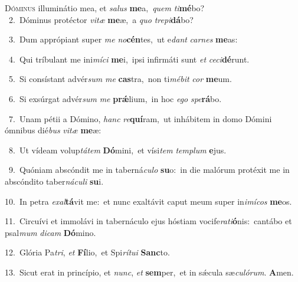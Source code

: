 \lettrine{\initial\textcolor{\initialcolor}{D}}{óminus} illuminátio mea, et \textit{sa}\-\textit{lus} \textbf{me}\-a,~\star \textit{quem} \textit{ti}\-\textbf{mé}bo?\\
{\numbfont\textcolor{\numbcolor}{~2.}}~Dóminus protéctor \textit{vi}\-\textit{tæ} \textbf{me}\-æ,~\star a \textit{quo} \textit{tre}\-\textit{pi}\textbf{dá}bo?\par
{\numbfont\textcolor{\numbcolor}{~3.}}~Dum apprópiant super \textit{me} \textit{no}\-\textbf{cén}tes,~\star ut e\textit{dant} \textit{car}\-\textit{nes} \textbf{me}\-as:\par
{\numbfont\textcolor{\numbcolor}{~4.}}~Qui tríbulant me ini\-\textit{mí}\-\textit{ci} \textbf{me}\-i,~\star ipsi infirmáti sunt \textit{et} \textit{ce}\-\textit{ci}\textbf{dé}runt.\par
{\numbfont\textcolor{\numbcolor}{~5.}}~Si consístant advér\textit{sum} \textit{me} \textbf{cas}\-tra,~\star non ti\-\textit{mé}\-\textit{bit} \textit{cor} \textbf{me}\-um.\par
{\numbfont\textcolor{\numbcolor}{~6.}}~Si exsúrgat advér\textit{sum} \textit{me} \textbf{prǽ}\-lium,~\star in hoc \textit{e}\-\textit{go} \textit{spe}\-\textbf{rá}bo.\par
{\numbfont\textcolor{\numbcolor}{~7.}}~Unam pétii a Dómino, \textit{hanc} \textit{re}\-\textbf{quí}ram,~\star ut inhábitem in domo Dómini ómnibus dié\textit{bus} \textit{vi}\-\textit{tæ} \textbf{me}\-æ:\par
{\numbfont\textcolor{\numbcolor}{~8.}}~Ut vídeam volup\-\textit{tá}\-\textit{tem} \textbf{Dó}\-mini,~\star et vísi\textit{tem} \textit{tem}\-\textit{plum} \textbf{e}\-jus.\par
{\numbfont\textcolor{\numbcolor}{~9.}}~Quóniam abscóndit me in taberná\-\textit{cu}\-\textit{lo} \textbf{su}\-o:~\star in die malórum protéxit me in abscóndito taber\-\textit{ná}\-\textit{cu}\textit{li} \textbf{su}\-i.\par
{\numbfont\textcolor{\numbcolor}{10.}}~In petra \textit{ex}\-\textit{al}\textbf{tá}vit me:~\star et nunc exaltávit caput meum super in\-\textit{i}\-\textit{mí}\textit{cos} \textbf{me}\-os.\par
{\numbfont\textcolor{\numbcolor}{11.}}~Circuívi et immolávi in tabernáculo ejus hóstiam vocife\-\textit{ra}\-\textit{ti}\textbf{ó}nis:~\star cantábo et psal\textit{mum} \textit{di}\-\textit{cam} \textbf{Dó}\-mino.\par
{\numbfont\textcolor{\numbcolor}{12.}}~Glória Pa\-\textit{tri}\-, \textit{et} \textbf{Fí}\-lio,~\star et Spi\-\textit{rí}\-\textit{tu}\textit{i} \textbf{Sanc}\-to.\par
{\numbfont\textcolor{\numbcolor}{13.}}~Sicut erat in princípio, et \textit{nunc}\-, \textit{et} \textbf{sem}\-per,~\star et in sǽcula sæ\-\textit{cu}\-\textit{ló}\textit{rum}. \textbf{A}\-men.\par
